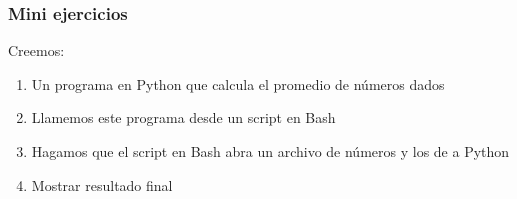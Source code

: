 \documentclass[14pt,aspectratio=169,xcolor=dvipsnames]{beamer}
\begin{document}
\begin{frame}
    \maketitle
\end{frame}
\begin{frame}[noframenumbering]\frametitle{Mini ejercicios}
    Creemos: 
    \begin{enumerate}
        \item Un programa en Python que calcula el promedio de números dados
        \item Llamemos este programa desde un script en Bash
        \item Hagamos que el script en Bash abra un archivo de números y los de a Python
        \item Mostrar resultado final
    \end{enumerate}
\end{frame}
\end{document}
